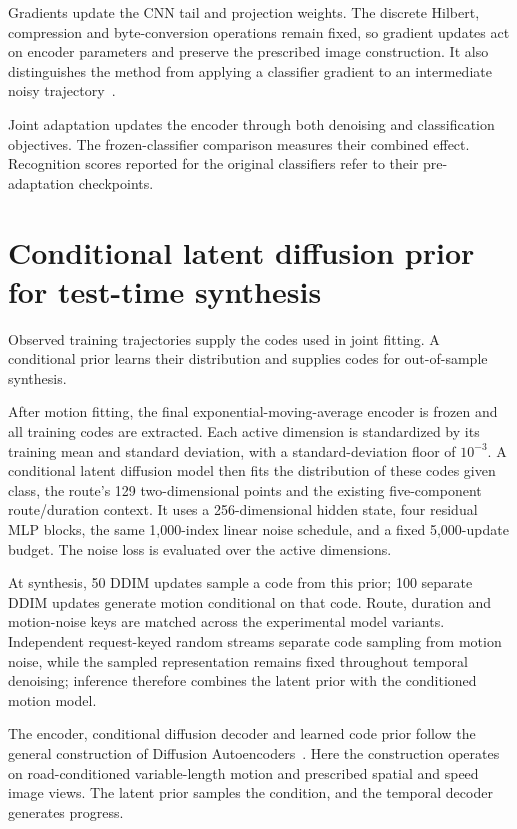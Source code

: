 Gradients update the CNN tail and projection weights. The discrete Hilbert, compression and byte-conversion operations remain fixed, so gradient updates act on encoder parameters and preserve the prescribed image construction. It also distinguishes the method from applying a classifier gradient to an intermediate noisy trajectory~\cite{cg,univ}.

Joint adaptation updates the encoder through both denoising and classification objectives. The frozen-classifier comparison measures their combined effect. Recognition scores reported for the original classifiers refer to their pre-adaptation checkpoints.

\section{Conditional latent diffusion prior for test-time synthesis}
Observed training trajectories supply the codes used in joint fitting. A conditional prior learns their distribution and supplies codes for out-of-sample synthesis.

After motion fitting, the final exponential-moving-average encoder is frozen and all training codes are extracted. Each active dimension is standardized by its training mean and standard deviation, with a standard-deviation floor of $10^{-3}$. A conditional latent diffusion model then fits the distribution of these codes given class, the route's 129 two-dimensional points and the existing five-component route/duration context. It uses a 256-dimensional hidden state, four residual MLP blocks, the same 1,000-index linear noise schedule, and a fixed 5,000-update budget. The noise loss is evaluated over the active dimensions.

At synthesis, 50 DDIM updates sample a code from this prior; 100 separate DDIM updates generate motion conditional on that code. Route, duration and motion-noise keys are matched across the experimental model variants. Independent request-keyed random streams separate code sampling from motion noise, while the sampled representation remains fixed throughout temporal denoising; inference therefore combines the latent prior with the conditioned motion model.

The encoder, conditional diffusion decoder and learned code prior follow the general construction of Diffusion Autoencoders~\cite{diffae}. Here the construction operates on road-conditioned variable-length motion and prescribed spatial and speed image views. The latent prior samples the condition, and the temporal decoder generates progress.

